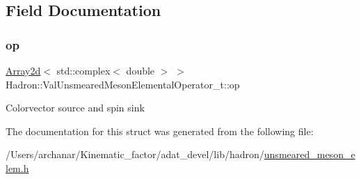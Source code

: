 \subsection{Field Documentation}
\mbox{\label{structHadron_1_1ValUnsmearedMesonElementalOperator__t_a9c26c91ba7ac8b4ed0c89f5a3bd247e4}} 
\subsubsection{\texorpdfstring{op}{op}}
{\footnotesize\ttfamily \mbox{\hyperlink{classXMLArray_1_1Array2d}{Array2d}}$<$ std\+::complex$<$ double $>$ $>$ Hadron\+::\+Val\+Unsmeared\+Meson\+Elemental\+Operator\+\_\+t\+::op}

Colorvector source and spin sink 

The documentation for this struct was generated from the following file\+:\begin{DoxyCompactItemize}
\item 
/\+Users/archanar/\+Kinematic\+\_\+factor/adat\+\_\+devel/lib/hadron/\mbox{\hyperlink{lib_2hadron_2unsmeared__meson__elem_8h}{unsmeared\+\_\+meson\+\_\+elem.\+h}}\end{DoxyCompactItemize}
